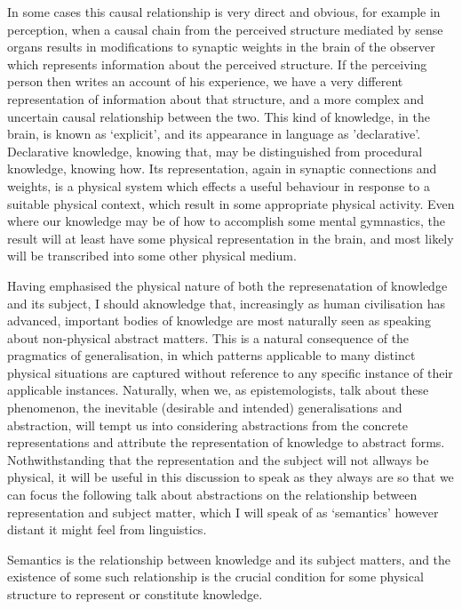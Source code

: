 In some cases this causal relationship is very direct and obvious, for example in perception, when a causal chain from the perceived structure mediated by sense organs results in modifications to synaptic weights in the brain of the observer which represents information about the perceived structure.
If the perceiving person then writes an account of his experience, we have a very different representation of information about that structure, and a more complex and uncertain causal relationship between the two.
This kind of knowledge, in the brain, is known as `explicit', and its appearance in language as 'declarative'.
Declarative knowledge, knowing that, may be distinguished from procedural knowledge, knowing how.
Its representation, again in synaptic connections and weights, is a physical system which effects a useful behaviour in response to a suitable physical context, which result in some appropriate physical activity.
Even where our knowledge may be of how to accomplish some mental gymnastics, the result will at least have some physical representation in the brain, and most likely will be transcribed into some other physical medium.

Having emphasised the physical nature of both the represenatation of knowledge and its subject, I should aknowledge that, increasingly as human civilisation has advanced, important bodies of knowledge are most naturally seen as speaking about non-physical abstract matters.
This is a natural consequence of the pragmatics of generalisation, in which patterns applicable to many distinct physical situations are captured without reference to any specific instance of their applicable instances.
Naturally, when we, as epistemologists, talk about these phenomenon, the inevitable (desirable and intended) generalisations and abstraction, will tempt us into considering abstractions from the concrete representations and attribute the representation of knowledge to abstract forms.
Nothwithstanding that the representation and the subject will not allways be physical, it will be useful in this discussion to speak as they always are so that we can focus the following talk about abstractions on the relationship between representation and subject matter, which I will speak of as `semantics' however distant it might feel from linguistics.

Semantics is the relationship between knowledge and its subject matters, and the existence of some such relationship is the crucial condition for some physical structure to represent or constitute knowledge.

